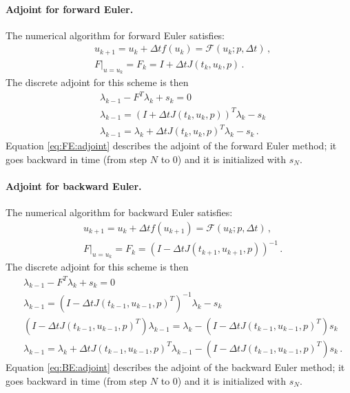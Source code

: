 \documentclass[10pt]{article}
\newcommand{\dt}{\Delta t}
\newcommand{\param}{p}
\newcommand{\ModelN}{{\mathcal{F}}}
\newcommand{\ModelTLM}{F}
\begin{document}
\paragraph{Adjoint for forward Euler.} The numerical algorithm for
forward Euler satisfies:
%
\begin{align}
  \label{eq:FE}
  &u_{k+1}=u_k + \dt f(u_k)= \ModelN(u_k;\param,\dt)\,,\\
  \nonumber
  &\left. \ModelTLM \right|_{u=u_k} =\ModelTLM_k = I + \dt
  J(t_k,u_k,\param)\,.
\end{align}
%
The discrete adjoint for this scheme is then
%
\begin{align}
\nonumber
&\lambda_{k-1}   -  \ModelTLM^T \lambda_k + s_k =0
\\
\nonumber
&\lambda_{k-1} = \left(I + \dt J(t_{k},u_{k},\param) \right)^T \lambda_k -
s_k
\\
\label{eq:FE:adjoint}
&\lambda_{k-1} =  \lambda_k + \dt J(t_k,u_k,\param)^T \lambda_k - s_k\,.
\end{align}
%
Equation \eqref{eq:FE:adjoint} describes the adjoint of the forward
Euler method; it goes backward in time (from step $N$ to $0$) and it
is initialized with $s_N$.


\paragraph{Adjoint for backward Euler.} The numerical algorithm for
backward Euler satisfies:
%
\begin{align}
  \label{eq:BE}
  &u_{k+1}=u_k + \dt f(u_{k+1})= \ModelN(u_k;\param,\dt)\,,\\
  \nonumber
  &\left. \ModelTLM \right|_{u=u_k} =\ModelTLM_k = \left(I - \dt
  J(t_{k+1},u_{k+1},\param)\right)^{-1}\,.
\end{align}
%
The discrete adjoint for this scheme is then
%
\begin{align}
\nonumber
&\lambda_{k-1}   -  \ModelTLM^T \lambda_k + s_k =0
\\
\nonumber
&\lambda_{k-1} = \left(I - \dt J(t_{k-1},u_{k-1},\param)^T \right)^{-1} \lambda_k -
s_k
\\
\nonumber
&\left(I - \dt J(t_{k-1},u_{k-1},\param)^T \right) \lambda_{k-1} = \lambda_k -
\left(I - \dt J(t_{k-1},u_{k-1},\param)^T \right) s_k\\
\label{eq:BE:adjoint}
& \lambda_{k-1} = \lambda_k + \dt J(t_{k-1},u_{k-1},\param)^T
\lambda_{k-1} -
\left(I - \dt J(t_{k-1},u_{k-1},\param)^T \right) s_k\,.
\end{align}
%
Equation \eqref{eq:BE:adjoint} describes the adjoint of the backward
Euler method; it goes backward in time (from step $N$ to $0$) and it
is initialized with $s_N$.
\end{document}
